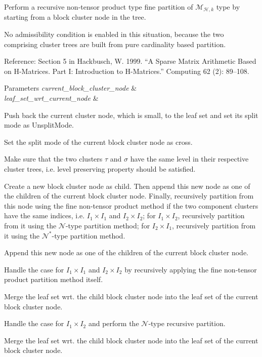 Perform a recursive non-\/tensor product type fine partition of $\mathcal{M}_{\mathcal{H},k}$ type by starting from a block cluster node in the tree.

No admissibility condition is enabled in this situation, because the two comprising cluster trees are built from pure cardinality based partition.

Reference\+: Section 5 in Hackbusch, W. 1999. “A Sparse Matrix Arithmetic Based on H-\/\+Matrices. Part I\+: Introduction to H-\/\+Matrices.” Computing 62 (2)\+: 89–108. 
\begin{DoxyParams}{Parameters}
{\em current\+\_\+block\+\_\+cluster\+\_\+node} & \\
\hline
{\em leaf\+\_\+set\+\_\+wrt\+\_\+current\+\_\+node} & \\
\hline
\end{DoxyParams}
Push back the current cluster node, which is small, to the leaf set and set its split mode as {\ttfamily Unsplit\+Mode}.

Set the split mode of the current block cluster node as cross.

Make sure that the two clusters $\tau$ and $\sigma$ have the same level in their respective cluster trees, i.\+e. level preserving property should be satisfied.

Create a new block cluster node as child. Then append this new node as one of the children of the current block cluster node. Finally, recursively partition from this node using the fine non-\/tensor product method if the two component clusters have the same indices, i.\+e. $I_1 \times I_1$ and $I_2 \times I_2$; for $I_1 \times I_2$, recursively partition from it using the $\mathcal{N}$-\/type partition method; for $I_2 \times I_1$, recursively partition from it using the $\mathcal{N}^*$-\/type partition method.

Append this new node as one of the children of the current block cluster node.

Handle the case for $I_1 \times I_1$ and $I_2 \times I_2$ by recursively applying the fine non-\/tensor product partition method itself.

Merge the leaf set wrt. the child block cluster node into the leaf set of the current block cluster node.

Handle the case for $I_1 \times I_2$ and perform the $\mathcal{N}$-\/type recursive partition.

Merge the leaf set wrt. the child block cluster node into the leaf set of the current block cluster node.

